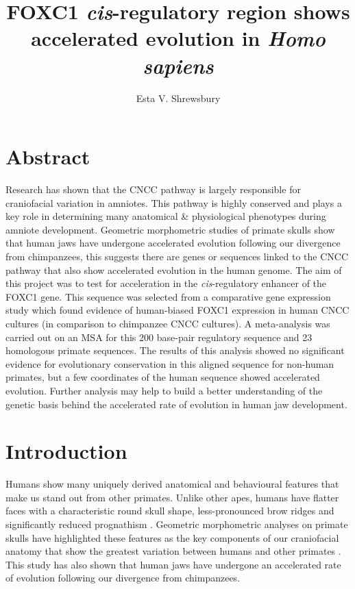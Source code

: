 \documentclass{article}[12pt]
\title{FOXC1 \emph{cis}-regulatory region shows accelerated evolution in \emph{Homo sapiens}}
\author{Esta V. Shrewsbury}
\begin{document}
\maketitle

\section{Abstract}

Research has shown that the \Gls{CNCC} pathway is largely responsible for craniofacial variation in amniotes. This pathway is highly conserved and plays a key role in determining many anatomical \& physiological phenotypes during amniote development. Geometric morphometric studies of primate skulls show that human jaws have undergone accelerated evolution following our divergence from chimpanzees, this suggests there are genes or sequences linked to the CNCC pathway that also show accelerated evolution in the human genome. The aim of this project was to test for acceleration in the \emph{cis}-regulatory enhancer of the \Gls{FOXC1} gene. This sequence was selected from a comparative gene expression study which found evidence of human-biased FOXC1 expression in human CNCC cultures (in comparison to chimpanzee CNCC cultures). A meta-analysis was carried out on an \Gls{MSA} for this 200 base-pair regulatory sequence and 23 homologous primate sequences. The results of this analysis showed no significant evidence for evolutionary conservation in this aligned sequence for non-human primates, but a few coordinates of the human sequence showed accelerated evolution. Further analysis may help to build a better understanding of the genetic basis behind the accelerated rate of evolution in human jaw development.
\newpage

\tableofcontents
\printglossary

\newpage

\section{Introduction}

Humans show many uniquely derived anatomical and behavioural features that make us stand out from other primates. Unlike other apes, humans have flatter faces with a characteristic round skull shape, less-pronounced brow ridges and significantly reduced prognathism \parencite{Martinez2009}. Geometric morphometric analyses on primate skulls have highlighted these features as the key components of our craniofacial anatomy that show the greatest variation between humans and other primates \parencite{Raia2018}. This study has also shown that human jaws have undergone an accelerated rate of evolution following our divergence from chimpanzees.
\end{document}
